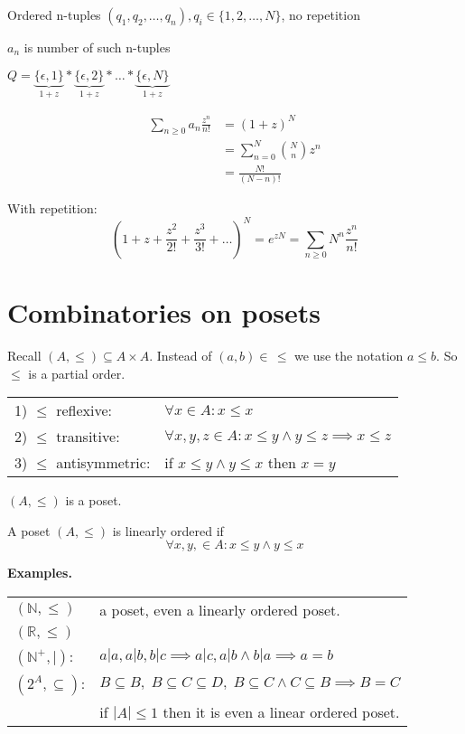 Ordered n-tuples $(q_1,q_2, \ldots, q_n), q_i \in \{1,2, \ldots, N\}$, no repetition

$a_n$ is number of such n-tuples

$Q = \underbrace{\{\epsilon,1\}}_{1+z} *
     \underbrace{\{\epsilon,2\}}_{1+z} * \ldots *
     \underbrace{\{\epsilon,N\}}_{1+z} $

\begin{align*}
  \sum_{n\geq 0} a_n \frac{z^n}{n!} &=
    (1+z)^N \\
    &= \sum_{n=0} ^{N} {N \choose n} z^n \\
    &= \frac{N!}{(N-n)!}
\end{align*}

With repetition:
\[
  (1+z+ \frac{z^2}{2!} + \frac{z^3}{3!} + \ldots)^N
    = e^{zN} = \sum_{n\geq 0} N^n \frac{z^n}{n!}
\]

\section{Combinatories on posets}

Recall $(A, \leq) \subseteq A \times A$.
Instead of $(a,b) \in \, \leq$ we use the notation $a \leq b$. So $\leq$ is a partial order.

\begin{tabular}{ll}
  1) $\leq$ reflexive: &
    $\forall x \in A: x \leq x$ \\
  2) $\leq$ transitive:  &
    $\forall x,y,z \in A: x \leq y \land y \leq z \implies x \leq z$ \\
  3) $\leq$ antisymmetric: &
    if $x \leq y \land y \leq x$ then $x = y$ \\
\end{tabular}

$(A,\leq)$ is a poset.

A poset $(A,\leq)$ is linearly ordered if
\[
  \forall x,y, \in A: x \leq y \land y \leq x
\]

\textbf{Examples.} \\
\begin{tabular}{l l}
  $(\mathbb{N}, \leq)$ & a poset, even a linearly ordered poset. \\
  $(\mathbb{R}, \leq)$ \\
  $(\mathbb{N}^{+}, |)$:
    & $a|a, a|b, b|c \implies a|c, a|b \land b|a \implies a = b$\\
  $(2^A, \subseteq)$:
    & $ B \subseteq B,\; B \subseteq C \subseteq D,\; B\subseteq C \land C \subseteq B \implies B = C$ \\
    & if $|A|\leq 1$ then it is even a linear ordered poset.
\end{tabular}

